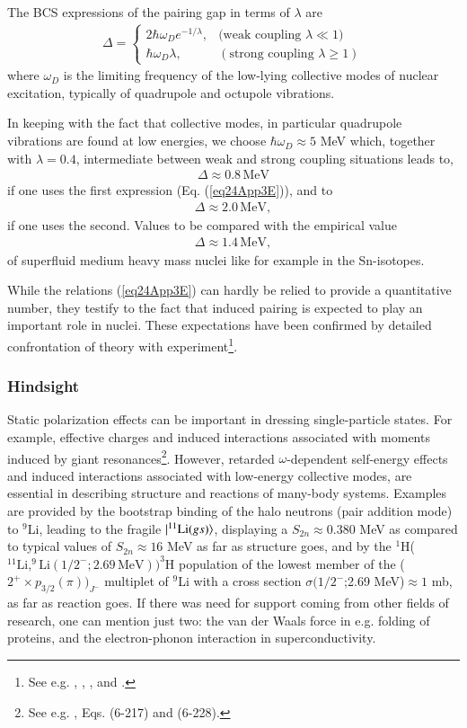 The BCS expressions of the pairing gap in terms of $\lambda$ are
\begin{align}\label{eq24App3E}
\Delta=\left\{\begin{array}{ll}
2\hbar\omega_De^{-1/\lambda},&\text{(weak coupling } \lambda\ll1)\\ 
\hbar\omega_D\lambda,&(\text{strong coupling }\lambda\geq1)
\end{array}
\right. 
\end{align}
where $\omega_D$ is the limiting frequency of the low-lying collective modes of nuclear excitation, typically of quadrupole and octupole vibrations. 


In keeping with the fact that collective modes, in particular quadrupole vibrations are found at low energies, we choose $\hbar\omega_D\approx5$ MeV which, together with  $\lambda=0.4$, intermediate between weak and strong coupling situations leads to,
\begin{align}
\Delta\approx 0.8\,\text{MeV}
\end{align}
if one uses the first expression (Eq. (\ref{eq24App3E})), and to
\begin{align}
\Delta\approx2.0\,\text{MeV},
\end{align}
if one uses the second. Values to be compared with the empirical value
\begin{align}
\Delta\approx1.4\,\text{MeV},
\end{align}
of superfluid medium heavy mass nuclei like for example in the Sn-isotopes.

While the relations (\ref{eq24App3E}) can hardly be relied to provide a quantitative number, they testify to the fact that induced pairing is expected to play an important role in nuclei. These expectations have been confirmed by detailed confrontation of theory with experiment\footnote{See e.g. \cite{Barranco:99}, \cite{Terasaki:02b}, \cite{Barranco:05}, and \cite{Idini:15}.}.
\subsubsection{Hindsight}
Static polarization effects can be important in dressing single-particle states. For example, effective charges  and induced interactions associated with moments induced by giant resonances\footnote{See e.g. \cite{Bohr:75}, Eqs. (6-217) and (6-228).}. However, retarded $\omega$-dependent self-energy effects and induced interactions associated with low-energy collective modes, are essential in describing structure and reactions of many-body systems. Examples are provided by the bootstrap binding of the halo neutrons (pair addition mode) to $^9$Li, leading to the fragile $|{^{11}\text{Li}(gs)} \rangle$, displaying a $S_{2n}\approx0.380$ MeV as compared to typical values of $S_{2n}\approx16$ MeV as far as structure goes, and by the $^1$H($^{11}\text{Li},^9\text{Li}(1/2^-;2.69\,\text{MeV}))^3$H population of the lowest member of the ($2^+\times p_{3/2}(\pi))_{J^-}$ multiplet of $^9$Li with a cross section $\sigma(1/2^-$;2.69 MeV)$\approx 1$ mb, as far as reaction goes.
If there was need for support coming from other fields of research, one can mention just two: the van der Waals force in e.g. folding of proteins, and the electron-phonon interaction in superconductivity.


